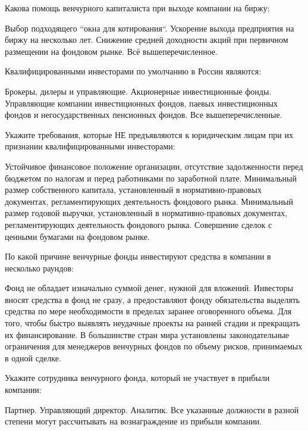 \documentclass[12pt, table]{exam}
\begin{document}
\begin{questions}
\begin{multicols}{2}
\question Какова помощь венчурного капиталиста при выходе компании на биржу:
\begin{choices}
	\choice Выбор подходящего ``окна для котирования``.
	\choice Ускорение выхода  предприятия на биржу на несколько лет.
	\choice Снижение средней доходности акций при первичном размещении на фондовом рынке.
	\CC Всё вышеперечисленное.
\end{choices}

\question Квалифицированными инвесторами по умолчанию в России являются:
\begin{choices}
	\choice Брокеры, дилеры и управляющие.
	\choice Акционерные инвестиционные фонды.
	\choice Управляющие компании инвестиционных фондов, паевых инвестиционных фондов и негосударственных пенсионных фондов.
	\CC Все вышеперечисленные.
\end{choices}

\question Укажите требования, которые НЕ предъявляются к юридическим лицам при их признании квалифицированными инвесторами:
\begin{choices}
	\CC Устойчивое финансовое положение организации, отсутствие задолженности перед бюджетом по налогам и перед работниками по заработной плате.
	\choice Минимальный размер собственного капитала, установленный в нормативно-правовых документах, регламентирующих деятельность фондового рынка.
	\choice Минимальный размер годовой выручки, установленный в нормативно-правовых документах, регламентирующих деятельность фондового рынка.
	\choice Совершение сделок с ценными бумагами на фондовом рынке.
\end{choices}

\question По какой причине венчурные фонды инвестируют средства в компании в несколько раундов:
\begin{choices}
	\choice Фонд не обладает изначально суммой денег, нужной для вложений.
	\choice Инвесторы вносят средства в фонд не сразу, а предоставляют фонду обязательства выделять средства по мере необходимости в пределах заранее оговоренного объема.
	\CC Для того, чтобы быстро выявлять неудачные проекты на ранней стадии и прекращать их финансирование.
	\choice В большинстве стран мира установлены законодательные ограничения для менеджеров венчурных фондов по объему рисков, принимаемых в одной сделке.
\end{choices}

\question Укажите сотрудника венчурного фонда, который не участвует в прибыли компании:
\begin{choices}
	\choice Партнер.
	\choice Управляющий директор.
	\CC Аналитик.
	\choice Все указанные должности в разной степени могут рассчитывать на вознаграждение из прибыли компании.
\end{choices}


\end{multicols}
\end{questions}
\end{document}
